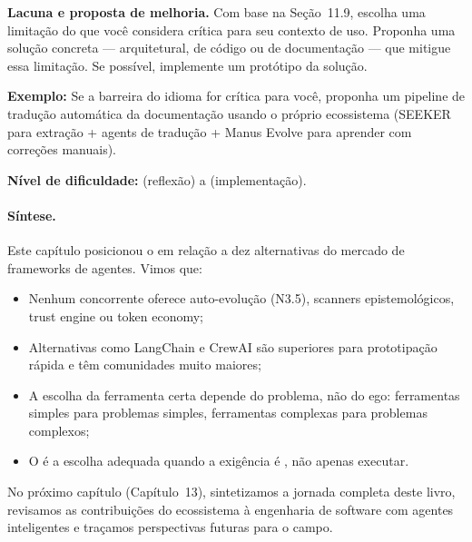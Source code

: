 \begin{exercicio}
\textbf{Lacuna e proposta de melhoria.} Com base na Seção~11.9, escolha uma
limitação do \opencodeeco{} que você considera crítica para seu contexto
de uso. Proponha uma solução concreta --- arquitetural, de código ou de
documentação --- que mitigue essa limitação. Se possível, implemente um
protótipo da solução.

\textbf{Exemplo:} Se a barreira do idioma for crítica para você, proponha
um pipeline de tradução automática da documentação usando o próprio
ecossistema (SEEKER para extração + agents de tradução + Manus Evolve para
aprender com correções manuais).

\textbf{Nível de dificuldade:} \nivelavancado{} (reflexão) a
\nivelphd{} (implementação).
\end{exercicio}


\paragraph{Síntese.} Este capítulo posicionou o \opencodeeco{} em relação a
dez alternativas do mercado de frameworks de agentes. Vimos que:
\begin{itemize}
    \item Nenhum concorrente oferece auto-evolução (N3.5), scanners
          epistemológicos, trust engine ou token economy;
    \item Alternativas como LangChain e CrewAI são superiores para
          prototipação rápida e têm comunidades muito maiores;
    \item A escolha da ferramenta certa depende do problema, não do
          ego: ferramentas simples para problemas simples, ferramentas
          complexas para problemas complexos;
    \item O \opencodeeco{} é a escolha adequada quando a exigência é
          , não apenas executar.
\end{itemize}

No próximo capítulo (Capítulo~13), sintetizamos a jornada
completa deste livro, revisamos as contribuições do ecossistema à
engenharia de software com agentes inteligentes e traçamos perspectivas
futuras para o campo.
